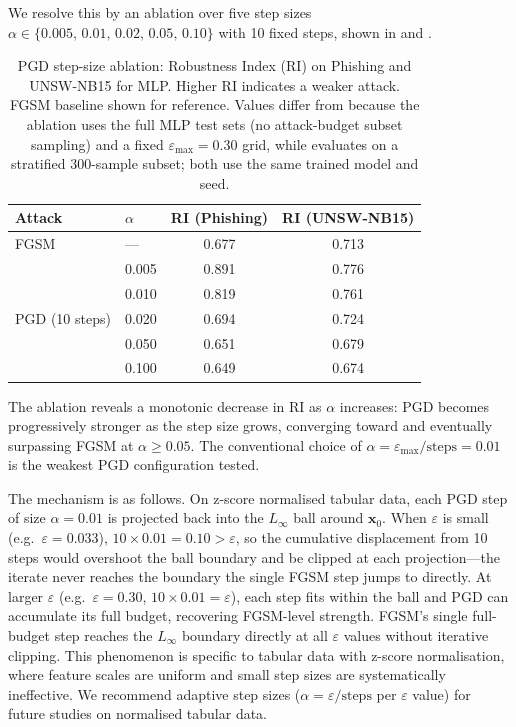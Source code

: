 \documentclass[runningheads]{llncs}
\begin{document}
We resolve this by an ablation over five step sizes
$\alpha \in \{0.005,\allowbreak\,0.01,\allowbreak\,0.02,\allowbreak\,0.05,\allowbreak\,0.10\}$
with 10 fixed steps, shown in  and .

\begin{table}[t]
\caption{PGD step-size ablation: Robustness Index (RI) on Phishing and UNSW-NB15
for MLP.  Higher RI indicates a weaker attack.  FGSM baseline shown for
reference.  Values differ from  because the ablation uses
the full MLP test sets (no attack-budget subset sampling) and a fixed
$\varepsilon_{\max}=0.30$ grid, while  evaluates on a
stratified 300-sample subset; both use the same trained model and seed.}
\label{tab:pgd_ablation}
\centering
\begin{tabular}{llcc}
\toprule
Attack & $\alpha$ & RI (Phishing) & RI (UNSW-NB15) \\
\midrule
FGSM        & ---   & 0.677 & 0.713 \\
\midrule
\multirow{5}{*}{PGD (10 steps)}
            & 0.005 & 0.891 & 0.776 \\
            & 0.010 & 0.819 & 0.761 \\
            & 0.020 & 0.694 & 0.724 \\
            & 0.050 & 0.651 & 0.679 \\
            & 0.100 & 0.649 & 0.674 \\
\bottomrule
\end{tabular}
\end{table}

The ablation reveals a monotonic decrease in RI as $\alpha$ increases: PGD
becomes progressively stronger as the step size grows, converging toward and
eventually surpassing FGSM at $\alpha \geq 0.05$.  The conventional choice of
$\alpha = \varepsilon_{\max}/\text{steps} = 0.01$ is the weakest PGD
configuration tested.

The mechanism is as follows.  On z-score normalised tabular data, each PGD step
of size $\alpha=0.01$ is projected back into the $L_\infty$ ball around
$\mathbf{x}_0$.  When $\varepsilon$ is small (e.g.\ $\varepsilon = 0.033$),
$10 \times 0.01 = 0.10 > \varepsilon$, so the cumulative displacement from 10
steps would overshoot the ball boundary and be clipped at each projection---the
iterate never reaches the boundary the single FGSM step jumps to directly.  At
larger $\varepsilon$ (e.g.\ $\varepsilon = 0.30$, $10 \times 0.01 = \varepsilon$),
each step fits within the ball and PGD can accumulate its full budget, recovering
FGSM-level strength.  FGSM's single full-budget step reaches the $L_\infty$
boundary directly at all $\varepsilon$ values without iterative clipping.  This phenomenon is specific to tabular
data with z-score normalisation, where feature scales are uniform and small step
sizes are systematically ineffective.  We recommend adaptive step sizes
($\alpha = \varepsilon / \text{steps}$ per $\varepsilon$ value) for future
studies on normalised tabular data.
\end{document}

